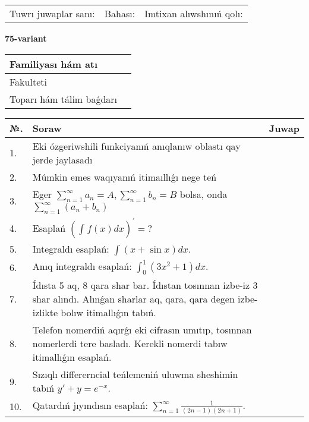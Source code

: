 \documentclass{article}
\begin{document}
\vspace{1cm}

\begin{tabular}{ c c c }
Tuwrı juwaplar sanı: \underline{\hspace{2cm}} & Bahası: \underline{\hspace{2cm}} & Imtixan alıwshınıń qolı: \underline{\hspace{2cm}} \\
\end{tabular}

\newpage

\begin{center}\textbf{75-variant}\end{center}

\bgroup
\def\arraystretch{1.5}
\begin{tabular}{ |m{6cm}|m{10cm}| }
  \hline
  Familiyası hám atı & \\
  \hline
  Fakulteti &\\
  \hline
  Toparı hám tálim baǵdarı & \\
  \hline
\end{tabular}
\egroup

\vspace{0.5cm}

\bgroup
\def\arraystretch{2}
\begin{tabular}{ |l|m{8cm}|m{7cm}| }
  \hline
  №. & Soraw & Juwap \\
  \hline
  1. & Eki ózgeriwshili funkciyanıń anıqlanıw oblastı qay jerde jaylasadı &  \\
  \hline
  2. & Múmkin emes waqıyanıń itimaıllıǵı nege teń &  \\
  \hline
  3. & Eger $\displaystyle\sum_{n = 1}^{\infty}a_{n} = A, \sum_{n = 1}^{\infty}b_{n} = B$ bolsa, onda $\displaystyle\sum_{n = 1}^{\infty}\left( a_{n} + b_{n} \right)$ &  \\
  \hline
  4. & Esaplań $\displaystyle \left( \int_{}^{}{f(x)dx} \right)^\prime = ?$ &  \\
  \hline
  5. & Integraldı esaplań: $\displaystyle\int (x + \sin x)dx$. &  \\
  \hline
  6. & Anıq integraldı esaplań: $\displaystyle\int_{0}^{1}{(3x^{2} + 1)dx}$. &  \\
  \hline
  7. & Ídısta 5 aq, 8 qara shar bar. Ídıstan tosınnan izbe-iz 3 shar alındı. Alınǵan sharlar aq, qara, qara degen izbe-izlikte bolıw itimallıǵın tabıń. &  \\
  \hline
  8. & Telefon nomerdiń aqırǵı eki cifrasın umıtıp, tosınnan nomerlerdi tere basladı. Kerekli nomerdi tabıw itimallıǵın esaplań. &  \\
  \hline
  9. & Sızıqlı differerncial teńlemeniń uluwma sheshimin tabıń $y' + y =e^{-x}$. &  \\
  \hline
  10. & Qatardıń jıyındısın esaplań: $\displaystyle\sum_{n = 1}^{\infty}\frac{1}{(2n - 1)(2n + 1)}$. &  \\
  \hline
\end{tabular}
\egroup
\end{document}
